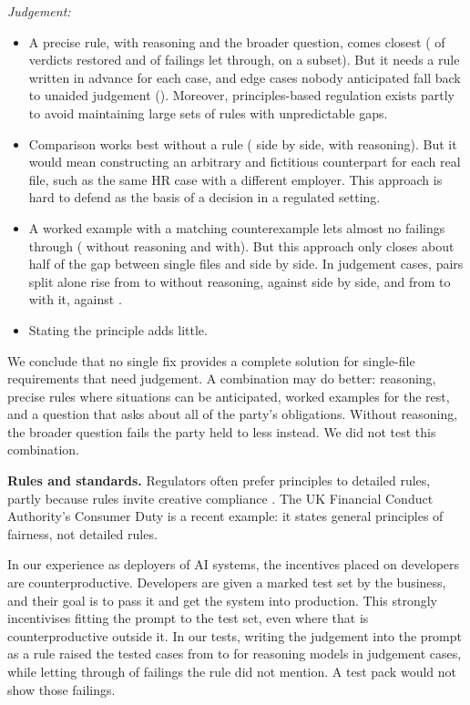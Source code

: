 \documentclass[11pt]{article}
\begin{document}
\emph{Judgement:}
\begin{itemize}
\item A precise rule, with reasoning and the broader question, comes closest (\RestoredRuleNewReasoning{} of verdicts
restored and \SecondWordingRuleNewReasoning{} of failings let through, on a subset). But it needs a rule written in
advance for each case, and edge cases nobody anticipated fall back to unaided judgement
(\AloneReasoningJudgement{}). Moreover, principles-based regulation exists partly to avoid maintaining large sets of rules
with unpredictable gaps.
\item Comparison works best without a rule (\SideBySideReasoningJudgement{} side by side, with reasoning). But it
would mean constructing an arbitrary and fictitious counterpart for each real file, such as the same HR case with a
different employer. This approach is hard to defend as the basis of a decision in a regulated setting.
\item A worked example with a matching counterexample lets almost no failings through (\ExampleLetThroughNoReasoning{}
without reasoning and \ExampleLetThroughReasoning{} with). But this approach only closes about half of the gap between
single files and side by side. In judgement cases, pairs split alone rise from \AloneNoReasoningJudgement{} to
\ExampleSplitNoReasoningJudgement{} without reasoning, against \SideBySideNoReasoningJudgement{} side by side, and
from \AloneReasoningJudgement{} to \ExampleSplitReasoningJudgement{} with it, against
\SideBySideReasoningJudgement{}.
\item Stating the principle adds little.
\end{itemize}
We conclude that no single fix provides a complete solution for single-file requirements that need judgement. A
combination may do better: reasoning, precise rules where situations can be anticipated, worked examples for the rest,
and a question that asks about all of the party's obligations. Without reasoning, the broader question fails the party
held to less instead. We did not test this combination.

\textbf{Rules and standards.} Regulators often prefer principles to detailed rules, partly because rules invite
creative compliance \citep{black2007making}. The UK Financial Conduct Authority's Consumer Duty is a recent example: it
states general principles of fairness, not detailed rules.

In our experience as deployers of AI systems, the incentives placed on developers are counterproductive. Developers
are given a marked test set by the business, and their goal is to pass it and get the system into production. This
strongly incentivises fitting the prompt to the test set, even where that is counterproductive outside it. In our
tests, writing the judgement into the prompt as a rule raised the tested cases from \AloneReasoningJudgement{} to
\ToldRuleReasoningJudgement{} for reasoning models in judgement cases, while letting through \LetThroughReasoningJudgement{} of failings the rule did not
mention. A test pack would not show those failings.
\end{document}
